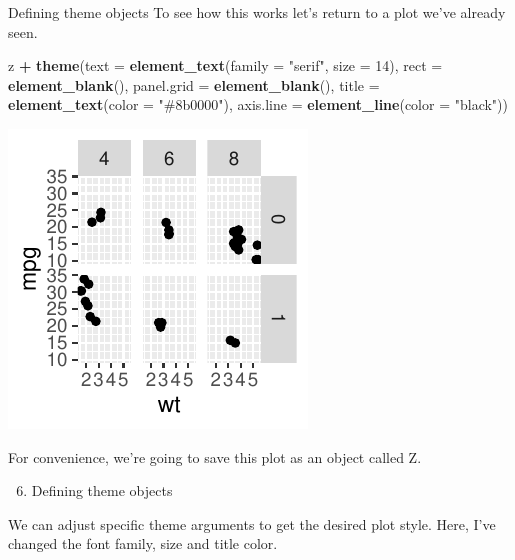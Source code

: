 \documentclass[
  ignorenonframetext,
]{beamer}
\newenvironment{Shaded}{\begin{snugshade}}{\end{snugshade}}
\newcommand{\AttributeTok}[1]{\textcolor[rgb]{0.13,0.29,0.53}{#1}}
\newcommand{\DecValTok}[1]{\textcolor[rgb]{0.00,0.00,0.81}{#1}}
\newcommand{\FunctionTok}[1]{\textcolor[rgb]{0.13,0.29,0.53}{\textbf{#1}}}
\newcommand{\NormalTok}[1]{#1}
\newcommand{\SpecialCharTok}[1]{\textcolor[rgb]{0.81,0.36,0.00}{\textbf{#1}}}
\newcommand{\StringTok}[1]{\textcolor[rgb]{0.31,0.60,0.02}{#1}}
\providecommand{\tightlist}{%
  \setlength{\itemsep}{0pt}\setlength{\parskip}{0pt}}
\begin{document}
\begin{frame}[fragile]{Defining theme objects}
\label{defining-theme-objects-2}
To see how this works let's return to a plot we've already seen.


\begin{Shaded}
\begin{Highlighting}[]
\NormalTok{z }\SpecialCharTok{+} \FunctionTok{theme}\NormalTok{(}\AttributeTok{text =} \FunctionTok{element\_text}\NormalTok{(}\AttributeTok{family =} \StringTok{"serif"}\NormalTok{, }\AttributeTok{size =} \DecValTok{14}\NormalTok{), }\AttributeTok{rect =} \FunctionTok{element\_blank}\NormalTok{(),}
    \AttributeTok{panel.grid =} \FunctionTok{element\_blank}\NormalTok{(), }\AttributeTok{title =} \FunctionTok{element\_text}\NormalTok{(}\AttributeTok{color =} \StringTok{"\#8b0000"}\NormalTok{),}
    \AttributeTok{axis.line =} \FunctionTok{element\_line}\NormalTok{(}\AttributeTok{color =} \StringTok{"black"}\NormalTok{))}
\end{Highlighting}
\end{Shaded}

\begin{center}\includegraphics[width=0.5\linewidth]{Figs/unnamed-chunk-75-1} \end{center}

For convenience, we're going to save this plot as an object called Z.

\begin{enumerate}
\setcounter{enumi}{5}
\tightlist
\item
  Defining theme objects
\end{enumerate}

We can adjust specific theme arguments to get the desired plot style.
Here, I've changed the font family, size and title color.


\end{frame}
\end{document}
